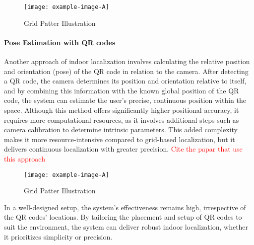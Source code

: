 \begin{figure}[h] %
	\centering
	\texttt{[image: example-image-A]}
	\caption{Grid Patter Illustration}
	\label{grid_pattern_illustration}
\end{figure}



\paragraph{Pose Estimation with QR codes}

Another approach of indoor localization involves calculating the relative position and orientation (pose) of the QR code in relation to the camera. After detecting a QR code, the camera determines its position and orientation relative to itself, and by combining this information with the known global position of the QR code, the system can estimate the user’s precise, continuous position within the space. Although this method offers significantly higher positional accuracy, it requires more computational resources, as it involves additional steps such as camera calibration to determine intrinsic parameters. This added complexity makes it more resource-intensive compared to grid-based localization, but it delivers continuous localization with greater precision. \textcolor{red} {Cite the papar that use this approach}

\begin{figure}[h] %
	\centering
	\texttt{[image: example-image-A]}
	\caption{Grid Patter Illustration}
	\label{pose_estimation_illustration}
\end{figure}


In a well-designed setup, the system's effectiveness remains high, irrespective of the QR codes’ locations. By tailoring the placement and setup of QR codes to suit the environment, the system can deliver robust indoor localization, whether it prioritizes simplicity or precision.